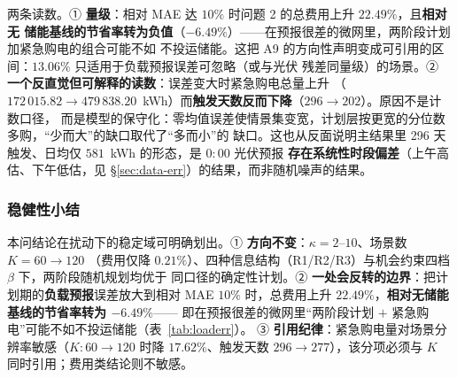 两条读数。① \textbf{量级}：相对 MAE 达 \(10\%\) 时问题 2 的总费用上升 \(22.49\%\)，且\textbf{相对无
储能基线的节省率转为负值}（\(-6.49\%\)）——在预报很差的微网里，两阶段计划加紧急购电的组合可能不如
不投运储能。这把 A9 的方向性声明变成可引用的区间：\(13.06\%\) 只适用于负载预报误差可忽略（或与光伏
残差同量级）的场景。② \textbf{一个反直觉但可解释的读数}：误差变大时紧急购电总量上升
（\(172\,015.82\to479\,838.20\)~kWh）而\textbf{触发天数反而下降}（\(296\to202\)）。原因不是计数口径，
而是模型的保守化：零均值误差使情景集变宽，计划层按更宽的分位数多购，“少而大”的缺口取代了“多而小”的
缺口。这也从反面说明主结果里 296 天触发、日均仅 \(581\)~kWh 的形态，是 \(0{:}00\) 光伏预报
\textbf{存在系统性时段偏差}（上午高估、下午低估，见 \S\ref{sec:data-err}）的结果，而非随机噪声的结果。

\subsubsection{稳健性小结}
本问结论在扰动下的稳定域可明确划出。① \textbf{方向不变}：\(\kappa=2\)--\(10\)、场景数 \(K=60\to120\)
（费用仅降 \(0.21\%\)）、四种信息结构（R1/R2/R3）与机会约束四档 \(\beta\) 下，两阶段随机规划均优于
同口径的确定性计划。② \textbf{一处会反转的边界}：把计划期的\textbf{负载预报}误差放大到相对 MAE
\(10\%\) 时，总费用上升 \(22.49\%\)，\textbf{相对无储能基线的节省率转为 \(-6.49\%\)}——
即在预报很差的微网里“两阶段计划 \(+\) 紧急购电”可能不如不投运储能（表~\ref{tab:loaderr}）。
③ \textbf{引用纪律}：紧急购电量对场景分辨率敏感（\(K:60\to120\) 时降 \(17.62\%\)、触发天数
\(296\to277\)），该分项必须与 \(K\) 同时引用；费用类结论则不敏感。
